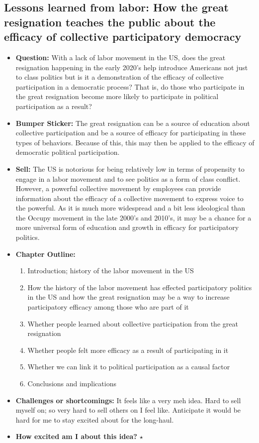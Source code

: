 \documentclass[12pt]{article}
\begin{document}
\subsection{Lessons learned from labor: How the great resignation teaches the public about the efficacy of collective participatory democracy}
    \begin{itemize}
        \item \textbf{Question:} With a lack of labor movement in the US, does the great resignation happening in the early 2020's help introduce Americans not just to class politics but is it a demonstration of the efficacy of collective participation in a democratic process? That is, do those who participate in the great resignation become more likely to participate in political participation as a result?
        \item \textbf{Bumper Sticker:} The great resignation can be a source of education about collective participation and be a source of efficacy for participating in these types of behaviors. Because of this, this may then be applied to the efficacy of democratic political participation.
        \item \textbf{Sell:} The US is notorious for being relatively low in terms of propensity to engage in a labor movement and to see politics as a form of class conflict. However, a powerful collective movement by employees can provide information about the efficacy of a collective movement to express voice to the powerful. As it is much more widespread and a bit less ideological than the Occupy movement in the late 2000's and 2010's, it may be a chance for a more universal form of education and growth in efficacy for participatory politics.
        \item \textbf{Chapter Outline:}
        \begin{enumerate}
            \item Introduction; history of the labor movement in the US
            \item How the history of the labor movement has effected participatory politics in the US and how the great resignation may be a way to increase participatory efficacy among those who are part of it
            \item Whether people learned about collective participation from the great resignation
            \item Whether people felt more efficacy as a result of participating in it
            \item Whether we can link it to political participation as a causal factor
            \item Conclusions and implications
        \end{enumerate}
        \item \textbf{Challenges or shortcomings:} It feels like a very meh idea. Hard to sell myself on; so very hard to sell others on I feel like. Anticipate it would be hard for me to stay excited about for the long-haul.
        \item \textbf{How excited am I about this idea?} $\star$
    \end{itemize}
\end{document}

